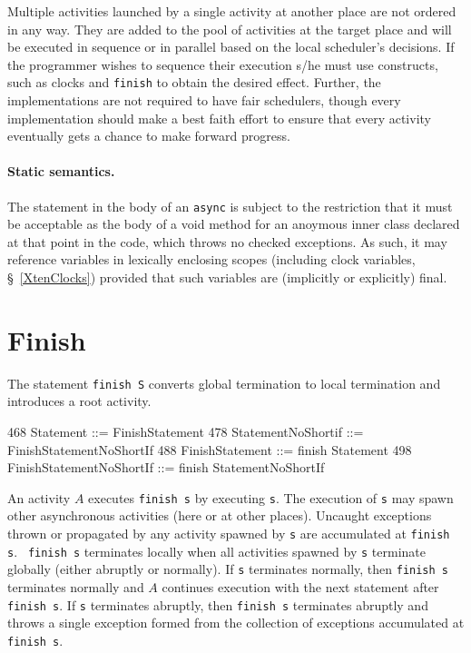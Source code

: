 Multiple activities launched by a single activity at another place are
not ordered in any way. They are added to the pool of activities at
the target place and will be executed in sequence or in parallel based
on the local scheduler's decisions. If the programmer wishes to
sequence their execution s/he must use \Xten{} constructs, such as
clocks and {\tt finish} to obtain the desired effect.  Further, the
\Xten{} implementations are not required to have fair schedulers,
though every implementation should make a best faith effort to ensure
that every activity eventually gets a chance to make forward progress.

\paragraph{Static semantics.}
The statement in the body of an {\tt async} is subject to the
restriction that it must be acceptable as the body of a {\cf void}
method for an anoymous inner class declared at that point in the code,
which throws no checked exceptions. As such, it may reference
variables in lexically enclosing scopes (including {\cf clock}
variables, \S~\ref{XtenClocks}) provided that such variables are
(implicitly or explicitly) {\cf final}.

\section{Finish}\label{finish}
The statement {\tt finish S} converts global termination to local
termination and introduces a root activity. 
\begin{x10}
468 Statement ::= FinishStatement
478 StatementNoShortif ::= 
      FinishStatementNoShortIf
488 FinishStatement ::= finish Statement
498 FinishStatementNoShortIf ::= 
      finish StatementNoShortIf
\end{x10}

An activity $A$ executes {\tt finish s} by executing {\tt s}.  The
execution of {\tt s} may spawn other asynchronous activities (here or
at other places).  Uncaught exceptions thrown or propagated by any
activity spawned by {\tt s} are accumulated at {\tt finish s}.  {\tt
finish s} terminates locally when all activities spawned by {\tt s}
terminate globally (either abruptly or normally). If
{\tt s} terminates normally, then {\tt finish s} terminates normally
and $A$ continues execution with the next statement after {\tt finish s}.
If {\tt s} terminates abruptly, then {\tt finish s}
terminates abruptly and throws a single exception formed 
from the collection of exceptions accumulated at {\tt finish s}.

